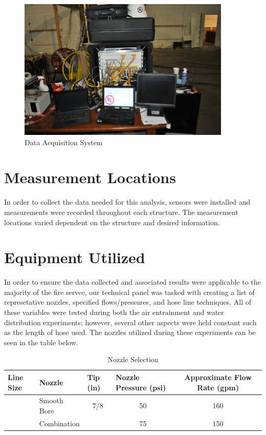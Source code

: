 \documentclass[12pt,oneside]{book}
\begin{document}
\begin{figure}[H]
	\centering
	\includegraphics[width = 4in]{0_Images/Instrumentation/DataSystem.jpg}
	\caption{Data Acquisition System}
	\label{fig:DataSystem}
\end{figure}

\clearpage

\section{Measurement Locations}

In order to collect the data needed for this analysis, sensors were installed and measurements were recorded throughout each structure. The measurement locations varied dependent on the structure and desired information.

\clearpage

\section{Equipment Utilized}

In order to ensure the data collected and associated results were applicable to the majority of the fire servce, our technical panel was tasked with creating a list of represetative nozzles, specified flows/pressures, and hose line techniques. All of these variables were tested during both the air entrainment and water distribution experiments; however, several other aspects were held constant such as the length of hose used. The nozzles utilized during these experiments can be seen in the table below.

\begin{table}[]
\centering
\begin{tabular}{|llccc|}
\hline
\multicolumn{1}{|l|}{\textbf{Line Size}} & \multicolumn{1}{l|}{\textbf{Nozzle}} & \multicolumn{1}{l|}{\textbf{Tip (in)}} & \multicolumn{1}{l|}{\textbf{Nozzle Pressure (psi)}} & \textbf{Approximate Flow Rate (gpm)} \\ \hline
 & Smooth Bore & 7/8 & 50 & 160 \\
 & Combination &  & 75 & 150 \\ \hline
\end{tabular}
\caption{Nozzle Selection}
\label{Nozzle Selection}
\end{table}
\end{document}

